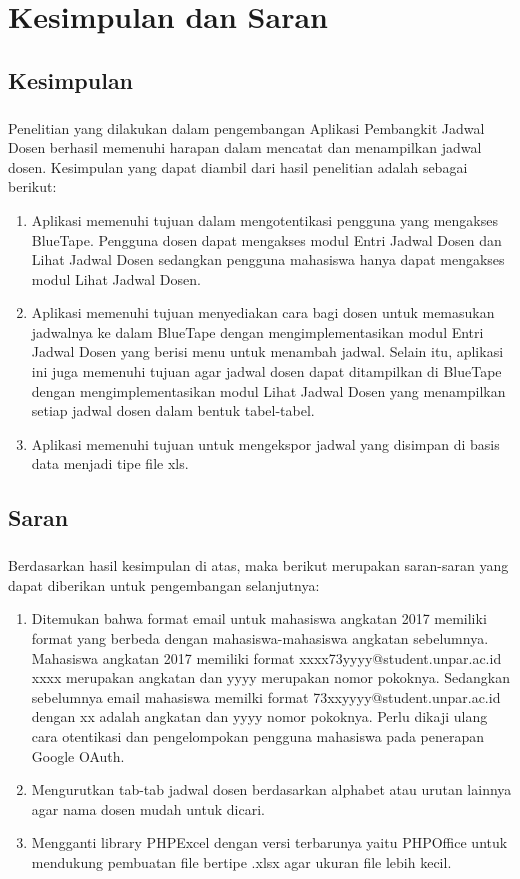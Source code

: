 \chapter{Kesimpulan dan Saran}
\section{Kesimpulan}
\paragraph{} Penelitian yang dilakukan dalam pengembangan Aplikasi Pembangkit Jadwal Dosen berhasil memenuhi harapan dalam mencatat dan menampilkan jadwal dosen. Kesimpulan yang dapat diambil dari hasil penelitian adalah sebagai berikut:
\begin{enumerate}
	\item Aplikasi memenuhi tujuan dalam mengotentikasi pengguna yang mengakses BlueTape. Pengguna dosen dapat mengakses modul Entri Jadwal Dosen dan Lihat Jadwal Dosen sedangkan pengguna mahasiswa hanya dapat mengakses modul Lihat Jadwal Dosen.
	\item Aplikasi memenuhi tujuan menyediakan cara bagi dosen untuk memasukan jadwalnya ke dalam BlueTape dengan mengimplementasikan modul Entri Jadwal Dosen yang berisi menu untuk menambah jadwal. Selain itu, aplikasi ini juga memenuhi tujuan agar jadwal dosen dapat ditampilkan di BlueTape dengan mengimplementasikan modul Lihat Jadwal Dosen yang menampilkan setiap jadwal dosen dalam bentuk tabel-tabel.
	\item Aplikasi memenuhi tujuan untuk mengekspor jadwal yang disimpan di basis data menjadi tipe file xls.
\end{enumerate}

\section{Saran}
\paragraph{}Berdasarkan hasil kesimpulan di atas, maka berikut merupakan saran-saran yang dapat diberikan untuk pengembangan selanjutnya:
\begin{enumerate}
	\item Ditemukan bahwa format email untuk mahasiswa angkatan 2017 memiliki format yang berbeda dengan mahasiswa-mahasiswa angkatan sebelumnya. Mahasiswa angkatan 2017 memiliki format xxxx73yyyy@student.unpar.ac.id xxxx merupakan angkatan dan yyyy merupakan nomor pokoknya. Sedangkan sebelumnya email mahasiswa memilki format 73xxyyyy@student.unpar.ac.id dengan xx adalah angkatan dan yyyy nomor pokoknya. Perlu dikaji ulang cara otentikasi dan pengelompokan pengguna mahasiswa pada penerapan Google OAuth.
	\item Mengurutkan tab-tab jadwal dosen berdasarkan alphabet atau urutan lainnya agar nama dosen mudah untuk dicari.
	\item Mengganti library PHPExcel dengan versi terbarunya yaitu PHPOffice untuk mendukung pembuatan file bertipe .xlsx agar ukuran file lebih kecil.
\end{enumerate}
